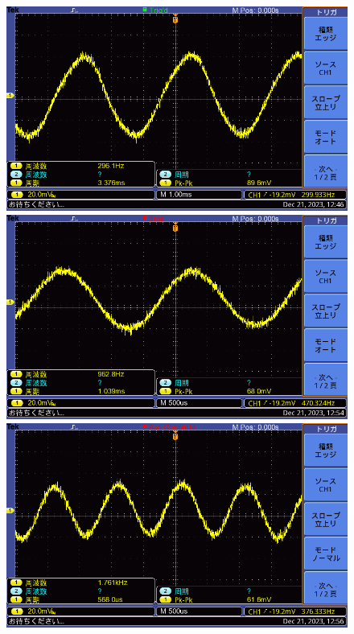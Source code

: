 \documentclass{ltjsarticle}
\begin{document}
\begin{figure}[H]
\begin{minipage}{0.4\columnwidth}
			\end{minipage}
			\hspace{0.04\columnwidth}
			\begin{minipage}{0.4\columnwidth}
			\centering
			\includegraphics[width = \columnwidth]{figs/F0023TEK.PNG}
			\end{minipage}
			\hspace{0.04\columnwidth}
			\begin{minipage}{0.4\columnwidth}
			\centering
			\includegraphics[width = \columnwidth]{figs/F0024TEK.PNG}
			\end{minipage}
			\hspace{0.04\columnwidth}
			\begin{minipage}{0.4\columnwidth}
			\centering
			\includegraphics[width = \columnwidth]{figs/F0025TEK.PNG}

\end{minipage}
\end{figure}
\end{document}
